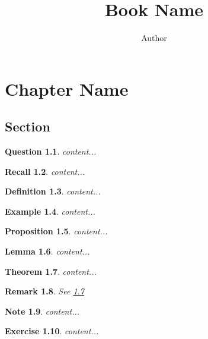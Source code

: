 \documentclass[english,12pt,a4paper]{extbook}
\title{Book Name}
\author{Author}
\newtheorem{theorem}{Theorem}[section]
\newtheorem{remark}[theorem]{Remark}
\newtheorem{note}[theorem]{Note}
\newtheorem{recall}[theorem]{Recall}
\newtheorem{definition}[theorem]{Definition}
\newtheorem{exercise}[theorem]{Exercise}
\newtheorem{question}[theorem]{Question}
\newtheorem{lemma}[theorem]{Lemma}
\newtheorem{proposition}[theorem]{Proposition}
\newtheorem{example}[theorem]{Example}
\begin{document}
	\maketitle %
	\tableofcontents %
	\chapter{Chapter Name}%
		\section{Section}%
			\begin{question}
				content...
			\end{question}
			\begin{recall}
				content...
			\end{recall}
			\begin{definition}
				content...
			\end{definition}
			\begin{example}
				content...
			\end{example}
				\begin{proposition}
					content...
				\end{proposition}
				\begin{lemma}
					content...
				\end{lemma}
				\begin{theorem}\label{thm:sample}
					content...
				\end{theorem}
				\begin{remark}
					See \ref{thm:sample}
				\end{remark}
				\begin{note}
					content...
				\end{note}
				
				\begin{exercise}
					content...
				\end{exercise}
				
	\printindex %
\end{document}
